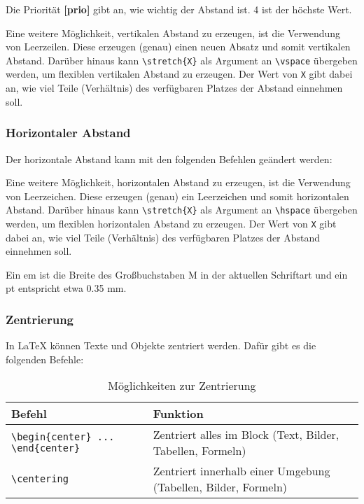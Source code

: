 Die Priorität \textbf{[prio]} gibt an, wie wichtig der Abstand ist. 4 ist der höchste Wert.

Eine weitere Möglichkeit, vertikalen Abstand zu erzeugen, ist die Verwendung von Leerzeilen. Diese erzeugen (genau) einen neuen Absatz und somit vertikalen Abstand.
Darüber hinaus kann \texttt{\textbackslash stretch\{X\}} als Argument an \texttt{\textbackslash vspace} übergeben werden, um flexiblen vertikalen Abstand zu erzeugen. Der Wert von \texttt{X} gibt dabei an, wie viel Teile (Verhältnis) des verfügbaren Platzes der Abstand einnehmen soll.

\subsubsection{Horizontaler Abstand}
Der horizontale Abstand kann mit den folgenden Befehlen geändert werden:



Eine weitere Möglichkeit, horizontalen Abstand zu erzeugen, ist die Verwendung von Leerzeichen. Diese erzeugen (genau) ein Leerzeichen und somit horizontalen Abstand.
Darüber hinaus kann \texttt{\textbackslash stretch\{X\}} als Argument an \texttt{\textbackslash hspace} übergeben werden, um flexiblen horizontalen Abstand zu erzeugen. Der Wert von \texttt{X} gibt dabei an, wie viel Teile (Verhältnis) des verfügbaren Platzes der Abstand einnehmen soll.

Ein em ist die Breite des Großbuchstaben M in der aktuellen Schriftart und ein pt entspricht etwa 0.35 mm.

\subsubsection{Zentrierung}
In \LaTeX{} können Texte und Objekte zentriert werden. Dafür gibt es die folgenden Befehle:
\begin{table}[H]
    \centering
    \begin{tabular}{lp{6cm}c}
        \toprule
        \textbf{Befehl} & \textbf{Funktion}                                              \\
        \midrule
        \texttt{\textbackslash begin\{center\} ... \textbackslash end\{center\}}
                        & Zentriert alles im Block (Text, Bilder, Tabellen, Formeln)     \\

        \texttt{\textbackslash centering}
                        & Zentriert innerhalb einer Umgebung (Tabellen, Bilder, Formeln) \\
        \bottomrule
    \end{tabular}
    \caption{Möglichkeiten zur Zentrierung}
    \label{tab:center_vs_centering}
\end{table}

